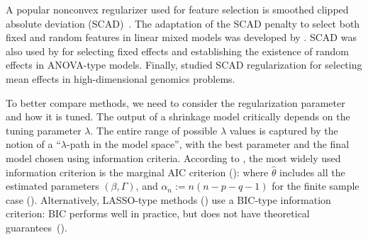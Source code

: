  A popular nonconvex regularizer used for feature selection is smoothed clipped absolute deviation (SCAD)~\cite{Fan2001}. 
The adaptation of the SCAD penalty to select both fixed and random features in 
linear mixed models was developed by \cite{Fan2012}. SCAD was also used by \cite{chen2015inference} for selecting fixed effects and establishing the existence of random effects in ANOVA-type models. Finally, \cite{Ghosh2018} studied SCAD regularization for selecting mean effects in high-dimensional genomics problems.


To better compare methods, we need to consider the regularization parameter 
\plum{$\lambda$} and how it is tuned. 
The output of a shrinkage model critically depends on the tuning parameter 
$\lambda$. The entire range of possible $\lambda$ values is captured 
by the notion of a ``$\lambda$-path in the model space'', with  the best parameter and the final model chosen using information criteria. According to \cite{Muller2013}, the most widely used information criterion is the marginal AIC criterion (\cite{Vaida2005}):
  where $\hat\theta$ includes all the estimated parameters $(\beta, \Gamma)$, and $\alpha_n := n(n-p-q-1)$ for the finite sample case (\cite{Sugiura1978}). 
  Alternatively, LASSO-type methods (\cite{Krishna2008, Ibrahim2011}) use a BIC-type information criterion:
BIC performs well in practice, but does not have theoretical guarantees~(\cite{schelldorfer2011estimation}).
  
  
